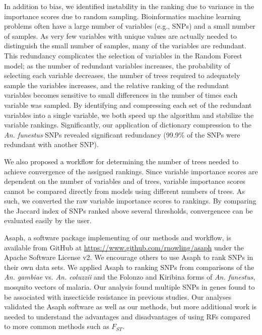 In addition to bias, we identified instability in the ranking due to variance in the importance scores due to random sampling.  Bioinformatics machine learning problems often have a large number of variables (e.g., SNPs) and a small number of samples.  As very few variables with unique values are actually needed to distinguish the small number of samples, many of the variables are redundant.  This redundancy complicates the selection of variables in the Random Forest model; as the number of redundant variables increases, the probability of selecting each variable decreases, the number of trees required to adequately sample the variables increases, and the relative ranking of the redundant variables becomes sensitive to small differences in the number of times each variable was sampled.  By identifying and compressing each set of the redundant variables into a single variable, we both speed up the algorithm and stabilize the variable rankings. Significantly, our application of dictionary compression to the \emph{An. funestus} SNPs revealed significant redundancy (99.9\% of the SNPs were redundant with another SNP).

We also proposed a workflow for determining the number of trees needed to achieve convergence of the assigned rankings. Since variable importance scores are dependent on the number of variables and of trees, variable importance scores cannot be compared directly from models using different numbers of trees.  As such, we converted the raw variable importance scores to rankings. By comparing the Jaccard index of SNPs ranked above several thresholds, convergencee can be evaluated easily by the user.

Asaph, a software package implementing of our methods and workflow, is available from GitHub at \url{https://www.github.com/rnowling/asaph} under the Apache Software License v2.  We encourage others to use Asaph to rank SNPs in their own data sets.  We applied Asaph to ranking SNPs from comparisons of the \emph{An. gambiae} vs. \emph{An. coluzzii} and the Folonzo and Kiribina forms of \emph{An. funestus}, mosquito vectors of malaria.  Our analysis found multiple SNPs in genes found to be associated with insecticide resistance in previous studies.  Our analyses validated the Asaph software as well as our methods, but more additional work is needed to understand the advantages and disadvantages of using RFs compared to more common methods such as $F_{ST}$.

